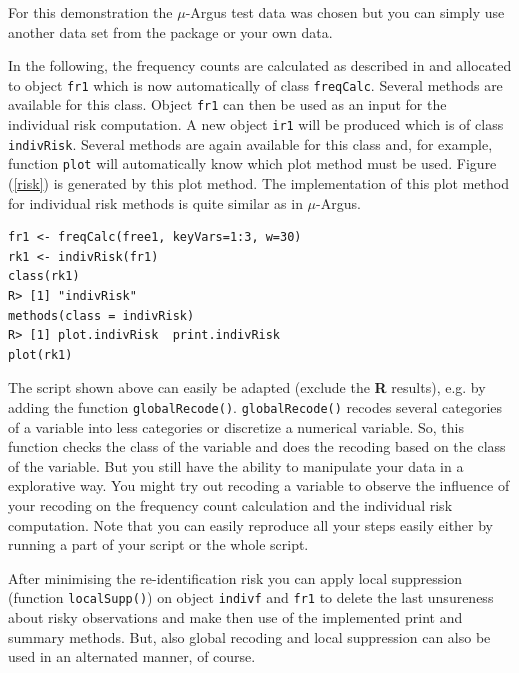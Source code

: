 \documentclass[12pt]{article}
\begin{document}
For this demonstration the $\mu$-Argus test data was chosen but you can simply use another data set from the package or your own data. 

In the following, the frequency counts are calculated as described in \cite{Capobianchi01} and allocated to object {\tt fr1} which is now automatically of class {\tt freqCalc}. Several methods are available for this class. Object {\tt fr1} can then be used as an input for the individual risk computation. A new object {\tt ir1} will be produced which is of class {\tt indivRisk}. Several methods are again available for this class and, for example, function {\tt plot} will automatically know which plot method must be used. Figure (\ref{risk}) is generated by this plot method. The implementation of this plot method for individual risk methods is quite similar as in $\mu$-Argus. 

\begin{footnotesize}
\begin{verbatim}
fr1 <- freqCalc(free1, keyVars=1:3, w=30)
rk1 <- indivRisk(fr1)
class(rk1)
R> [1] "indivRisk"
methods(class = indivRisk)
R> [1] plot.indivRisk  print.indivRisk
plot(rk1)
\end{verbatim}
\end{footnotesize}

The script shown above can easily be adapted  (exclude the {\bf R} results), e.g. 
by adding the function {\tt globalRecode()}. {\tt globalRecode()} recodes several
categories of a variable into less categories or discretize a numerical variable. So, this function checks the class of the variable and does the recoding based on the class of the variable. But you still have the ability to manipulate your data in a explorative way. You might try out recoding a variable to observe the influence of your recoding on the frequency count calculation and the individual risk computation. Note that you can easily reproduce all your steps easily either by running a part of your script or the whole script. 

After minimising the re-identification risk you can apply local suppression (function {\tt localSupp()}) on object {\tt indivf} and {\tt fr1} to delete the last unsureness about risky observations and make then use of the implemented print and summary methods. But, also global recoding and local suppression can also be used in an alternated manner, of course.
\end{document}

